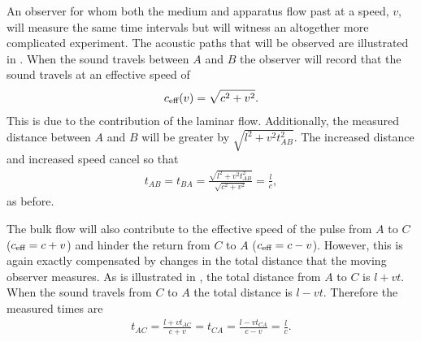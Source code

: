 An observer for whom  both the medium and apparatus flow past at a speed, $v$, will measure the same time intervals 
but will witness an altogether more complicated experiment.
The acoustic paths that will be observed are illustrated in .
When the sound travels between $A$ and $B$ the observer will record that the sound travels at an effective speed of
\begin{align}
\label{eqn:ceffone}
c_{\textrm{eff}}(v) = \sqrt{c^2 +v^2}.
\end{align}
This is due to  the  contribution of the  laminar flow.
Additionally, the measured distance between $A$ and $B$ will be greater by  $\sqrt{l^2+v^2t_{AB}^2}$.
The increased distance and increased speed cancel so that 
\begin{align}
  \label{eqn:setupA:moving:Tab}
  t_{AB} = t_{BA} = \frac{\sqrt{l^2+v^2t_{AB}^2}}{\sqrt{c^2 +v^2}} = \frac{l}{c},
\end{align}
as before.

The bulk flow will also contribute to the effective speed of the pulse from $A$ to $C$  ($c_{\textrm{eff}} = c+v$) 
and hinder  the return from $C$ to $A$ ($c_{\textrm{eff}} = c-v$).
However, this is again exactly compensated by changes in the total distance that the moving observer measures.
As is illustrated in , the total distance from $A$ to $C$ is $l+vt$. %
When the sound travels from $C$ to $A$ the total  distance is $l-vt$. %
%
Therefore the measured times are
\begin{align}
  \label{eqn:setupA:moving:Tac}
  t_{AC} =  \frac{l+vt_{AC}}{c+v}= t_{CA} =  \frac{l-vt_{CA}}{c-v}= \frac{l}{c}.
\end{align}

